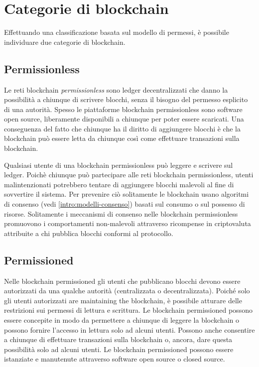 \section{Categorie di blockchain}
Effettuando una classificazione basata sul modello di permessi,
è possibile individuare due categorie di blockchain.

\subsection{Permissionless}
Le reti blockchain \textit{permissionless} sono ledger decentralizzati che danno la possibilità
a chiunque di scrivere blocchi, senza il bisogno del permesso esplicito di una autorità.
Spesso le piattaforme blockchain permissionless sono software open source, liberamente
disponibili a chiunque per poter essere scaricati. Una conseguenza del fatto che
chiunque ha il diritto di aggiungere blocchi è che la blockchain può essere letta da chiunque
così come effettuare transazioni sulla blockchain.

Qualsiasi utente di una blockchain permissionless può leggere e scrivere sul ledger.
Poichè chiunque può partecipare alle reti blockchain permissionless, utenti malintenzionati
potrebbero tentare di aggiungere blocchi malevoli al fine di sovvertire il sistema.
Per prevenire ciò solitamente le blockchain usano algoritmi di consenso
(vedi \ref{intro:modelli-consenso}) basati sul consumo o sul possesso di risorse.
Solitamente i meccanismi di consenso nelle blockchain
permissionless promuovono i comportamenti non-malevoli attraverso ricompense in criptovaluta
attribuite a chi pubblica blocchi conformi al protocollo.

\subsection{Permissioned}
Nelle blockchain permissioned gli utenti che pubblicano blocchi devono essere autorizzati da una
qualche autorità (centralizzata o decentralizzata). Poiché solo gli utenti autorizzati are maintaining
the blockchain, è possibile atturare delle restrizioni sui permessi di lettura e scrittura.
Le blockchain permissioned possono essere concepite in modo da permettere a chiunque di
leggere la blockchain o possono fornire l'accesso in lettura solo ad alcuni utenti.
Possono anche consentire a chiunque di effettuare transazioni sulla blockchain o, ancora,
dare questa possibilità solo ad alcuni utenti. Le blockchain permissioned possono essere
istanziate e manutenute attraverso software open source o closed source.

